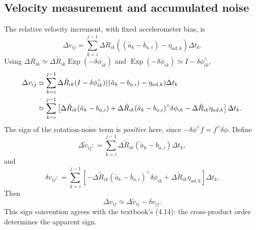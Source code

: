 \documentclass[11pt,a4paper]{article}
\newcommand{\Exp}{\operatorname{Exp}}
\newcommand{\defeq}{\mathrel{\mathop:}=}
\begin{document}
\subsection{Velocity measurement and accumulated noise}
The relative velocity increment, with fixed accelerometer bias, is
\begin{equation}
\Delta v_{ij}
=\sum_{k=i}^{j-1}\Delta R_{ik}((\tilde a_k-b_{a,i})-\eta_{ad,k})\Delta t_k.
\end{equation}
Using $\Delta R_{ik}\simeq\Delta\tilde R_{ik}\Exp(-\delta\phi_{ik})$
and $\Exp(-\delta\phi_{ik})\simeq I-\delta\phi_{ik}^{\wedge}$,
\begin{align}
\Delta v_{ij}
&\simeq\sum_{k=i}^{j-1}
\Delta\tilde R_{ik}(I-\delta\phi_{ik}^{\wedge})
((\tilde a_k-b_{a,i})-\eta_{ad,k})\Delta t_k\notag\\
&\simeq\sum_{k=i}^{j-1}
\left[
\Delta\tilde R_{ik}(\tilde a_k-b_{a,i})
+\Delta\tilde R_{ik}(\tilde a_k-b_{a,i})^\wedge\delta\phi_{ik}
-\Delta\tilde R_{ik}\eta_{ad,k}
\right]\Delta t_k.
\end{align}
The sign of the rotation-noise term is \emph{positive} here, since
$-\delta\phi^\wedge f=f^\wedge\delta\phi$.
Define
\begin{equation}\label{eq:tildev}
\boxed{\Delta\tilde v_{ij}\defeq
\sum_{k=i}^{j-1}\Delta\tilde R_{ik}(\tilde a_k-b_{a,i})\Delta t_k,}
\end{equation}
and
\begin{equation}\label{eq:dvnoise}
\boxed{\delta v_{ij}\defeq
\sum_{k=i}^{j-1}\left[
-\Delta\tilde R_{ik}(\tilde a_k-b_{a,i})^\wedge\delta\phi_{ik}
+\Delta\tilde R_{ik}\eta_{ad,k}
\right]\Delta t_k.}
\end{equation}
Then
\begin{equation}\label{eq:velNoise}
\boxed{\Delta v_{ij}\simeq\Delta\tilde v_{ij}-\delta v_{ij}.}
\end{equation}
This sign convention agrees with the textbook's (4.14):
the cross-product order determines the apparent sign.
\end{document}
